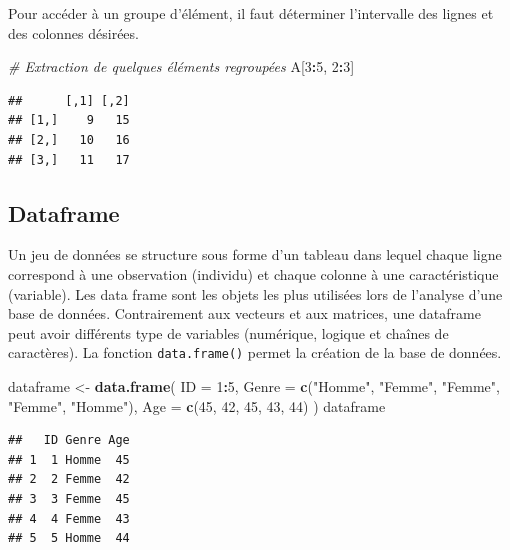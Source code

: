\documentclass[
]{book}
\newenvironment{Shaded}{\begin{snugshade}}{\end{snugshade}}
\newcommand{\AttributeTok}[1]{\textcolor[rgb]{0.13,0.29,0.53}{#1}}
\newcommand{\CommentTok}[1]{\textcolor[rgb]{0.56,0.35,0.01}{\textit{#1}}}
\newcommand{\DecValTok}[1]{\textcolor[rgb]{0.00,0.00,0.81}{#1}}
\newcommand{\FunctionTok}[1]{\textcolor[rgb]{0.13,0.29,0.53}{\textbf{#1}}}
\newcommand{\NormalTok}[1]{#1}
\newcommand{\OtherTok}[1]{\textcolor[rgb]{0.56,0.35,0.01}{#1}}
\newcommand{\SpecialCharTok}[1]{\textcolor[rgb]{0.81,0.36,0.00}{\textbf{#1}}}
\newcommand{\StringTok}[1]{\textcolor[rgb]{0.31,0.60,0.02}{#1}}
\begin{document}
Pour accéder à un groupe d'élément, il faut déterminer l'intervalle des lignes et des colonnes désirées.

\begin{Shaded}
\begin{Highlighting}[]
\CommentTok{\# Extraction de quelques éléments regroupées}
\NormalTok{A[}\DecValTok{3}\SpecialCharTok{:}\DecValTok{5}\NormalTok{, }\DecValTok{2}\SpecialCharTok{:}\DecValTok{3}\NormalTok{]}
\end{Highlighting}
\end{Shaded}

\begin{verbatim}
##      [,1] [,2]
## [1,]    9   15
## [2,]   10   16
## [3,]   11   17
\end{verbatim}

\subsection{Dataframe}\label{dataframe}

Un jeu de données se structure sous forme d'un tableau dans lequel chaque ligne correspond à une observation (individu) et chaque colonne à une caractéristique (variable). Les data frame sont les objets les plus utilisées lors de l'analyse d'une base de données. Contrairement aux vecteurs et aux matrices, une dataframe peut avoir différents type de variables (numérique, logique et chaînes de caractères). La fonction \texttt{data.frame()} permet la création de la base de données.

\begin{Shaded}
\begin{Highlighting}[]
\NormalTok{dataframe }\OtherTok{\textless{}{-}} \FunctionTok{data.frame}\NormalTok{(}
  \AttributeTok{ID =} \DecValTok{1}\SpecialCharTok{:}\DecValTok{5}\NormalTok{,}
  \AttributeTok{Genre =} \FunctionTok{c}\NormalTok{(}\StringTok{"Homme"}\NormalTok{, }\StringTok{"Femme"}\NormalTok{, }\StringTok{"Femme"}\NormalTok{, }\StringTok{"Femme"}\NormalTok{, }\StringTok{"Homme"}\NormalTok{),}
  \AttributeTok{Age =} \FunctionTok{c}\NormalTok{(}\DecValTok{45}\NormalTok{, }\DecValTok{42}\NormalTok{, }\DecValTok{45}\NormalTok{, }\DecValTok{43}\NormalTok{, }\DecValTok{44}\NormalTok{)}
\NormalTok{)}
\NormalTok{dataframe}
\end{Highlighting}
\end{Shaded}

\begin{verbatim}
##   ID Genre Age
## 1  1 Homme  45
## 2  2 Femme  42
## 3  3 Femme  45
## 4  4 Femme  43
## 5  5 Homme  44
\end{verbatim}
\end{document}
